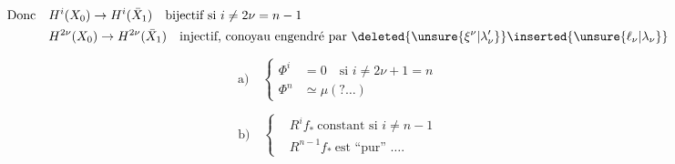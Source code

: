\[
\begin{aligned}
\text{Donc}\quad & H^i(X_0)\to H^i(\bar X_1)\quad\text{bijectif si }i\ne2\nu=n-1\\
& H^{2\nu}(X_0)\to H^{2\nu}(\bar X_1)\quad\text{injectif, conoyau engendré par }\deleted{\unsure{\xi^\nu|\lambda'_\nu}}\inserted{\unsure{\ell_\nu|\lambda_\nu}}
\end{aligned}
\]

\[
\text{a)}\quad\left\{\begin{aligned}\Phi^i&=0\quad\text{si }i\ne2\nu+1=n\\
\Phi^n&\simeq\mu(?\ldots)\end{aligned}\right.
\]

\[
\text{b)}\quad\left\{\begin{aligned}
&R^i f_*\ \text{constant si }i\ne n-1\\
&R^{n-1}f_*\ \text{est ``pur'' \ldots.}
\end{aligned}\right.
\]


